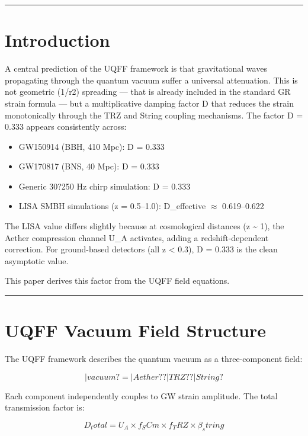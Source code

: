 \documentclass[12pt,a4paper]{article}
\begin{document}
\medskip\hrule\medskip

\section{Introduction}

A central prediction of the UQFF framework is that gravitational waves propagating through the quantum vacuum suffer a universal attenuation. This is not geometric (1/r2) spreading --- that is already included in the standard GR strain formula --- but a multiplicative damping factor D that reduces the strain monotonically through the TRZ and String coupling mechanisms. The factor D = 0.333 appears consistently across:

\begin{itemize}
  \item GW150914 (BBH, 410 Mpc): D = 0.333
  \item GW170817 (BNS, 40 Mpc): D = 0.333
  \item Generic 30?250 Hz chirp simulation: D = 0.333
  \item LISA SMBH simulations (z = 0.5--1.0): D\_effective $\approx$ 0.619--0.622
\end{itemize}

The LISA value differs slightly because at cosmological distances (z \textasciitilde{} 1), the Aether compression channel U\_A activates, adding a redshift-dependent correction. For ground-based detectors (all z < 0.3), D = 0.333 is the clean asymptotic value.

This paper derives this factor from the UQFF field equations.

\medskip\hrule\medskip

\section{UQFF Vacuum Field Structure}

The UQFF framework describes the quantum vacuum as a three-component field:

\begin{equation}
|vacuum? = |Aether? ? |TRZ? ? |String?
\end{equation}

Each component independently couples to GW strain amplitude. The total transmission factor is:

\begin{equation}
D_total = U_A \times f_SCm \times f_TRZ \times \beta_string
\end{equation}
\end{document}
